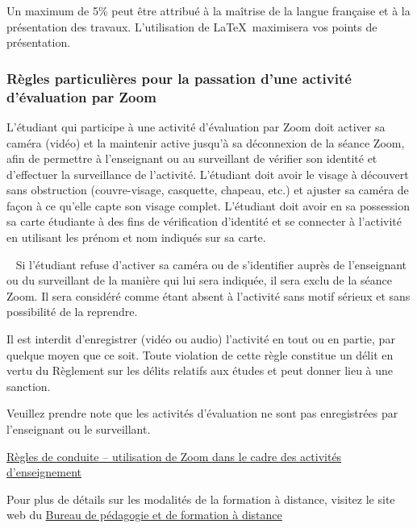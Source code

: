 \documentclass[12pt,undergraduate]{uqtrplandecours}
\begin{document}
Un maximum de 5\% peut être attribué à la maîtrise de la langue française
  et à la présentation des travaux.
%
L'utilisation de \LaTeX \ maximisera vos points de présentation.

\subsubsection*{Règles particulières pour la passation d’une activité d’évaluation par Zoom}

L’étudiant qui participe à une activité d’évaluation par Zoom doit activer sa caméra (vidéo) et la maintenir active jusqu’à sa déconnexion de la séance Zoom, afin de permettre à l’enseignant ou au surveillant de vérifier son identité et d’effectuer la surveillance de l’activité. L’étudiant doit avoir le visage à découvert sans obstruction (couvre-visage, casquette, chapeau, etc.) et ajuster sa caméra de façon à ce qu’elle capte son visage complet. L’étudiant doit avoir en sa possession sa carte étudiante à des fins de vérification d’identité et se connecter à l’activité en utilisant les prénom et nom indiqués sur sa carte.

 
Si l’étudiant refuse d’activer sa caméra ou de s’identifier auprès de l’enseignant ou du surveillant de la manière qui lui sera indiquée, il sera exclu de la séance Zoom. Il sera considéré comme étant absent à l’activité sans motif sérieux et sans possibilité de la reprendre.

Il est interdit d’enregistrer (vidéo ou audio) l’activité en tout ou en partie, par quelque moyen que ce soit. Toute violation de cette règle constitue un délit en vertu du Règlement sur les délits relatifs aux études et peut donner lieu à une sanction.

Veuillez prendre note que les activités d’évaluation ne sont pas enregistrées par l’enseignant ou le surveillant.

\medskip
\href{https://oraprdnt.uqtr.uquebec.ca/pls/public/docs/GSC5087/O0003262120_Regles_de_conduite_utilisation_Zoom.pdf}%
     {Règles de conduite – utilisation de Zoom dans le cadre des activités d’enseignement}

Pour plus de détails sur les modalités de la formation à distance, visitez le site web du
\href{https://oraprdnt.uqtr.uquebec.ca/pls/public/gscw031?owa_no_site=3939&owa_no_fiche=90}%
     {Bureau de pédagogie et de formation à distance}

\end{document}
